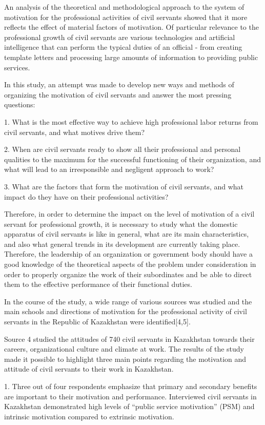 \begin{multicols}{2}
An analysis of the theoretical and methodological approach to the system
of motivation for the professional activities of civil servants showed
that it more reflects the effect of material factors of motivation. Of
particular relevance to the professional growth of civil servants are
various technologies and artificial intelligence that can perform the
typical duties of an official - from creating template letters and
processing large amounts of information to providing public services.

In this study, an attempt was made to develop new ways and methods of
organizing the motivation of civil servants and answer the most pressing
questions:

1. What is the most effective way to achieve high professional labor
returns from civil servants, and what motives drive them?

2. When are civil servants ready to show all their professional and
personal qualities to the maximum for the successful functioning of
their organization, and what will lead to an irresponsible and negligent
approach to work?

3. What are the factors that form the motivation of civil servants, and
what impact do they have on their professional activities?

Therefore, in order to determine the impact on the level of motivation
of a civil servant for professional growth, it is necessary to study
what the domestic apparatus of civil servants is like in general, what
are its main characteristics, and also what general trends in its
development are currently taking place. Therefore, the leadership of an
organization or government body should have a good knowledge of the
theoretical aspects of the problem under consideration in order to
properly organize the work of their subordinates and be able to direct
them to the effective performance of their functional duties.

In the course of the study, a wide range of various sources was studied
and the main schools and directions of motivation for the professional
activity of civil servants in the Republic of Kazakhstan were
identified{[}4,5{]}.

Source 4 studied the attitudes of 740 civil servants in Kazakhstan
towards their careers, organizational culture and climate at work. The
results of the study made it possible to highlight three main points
regarding the motivation and attitude of civil servants to their work in
Kazakhstan.

1. Three out of four respondents emphasize that primary and secondary
benefits are important to their motivation and performance. Interviewed
civil servants in Kazakhstan demonstrated high levels of ``public
service motivation'' (PSM) and intrinsic motivation compared to
extrinsic motivation.


\end{multicols}

